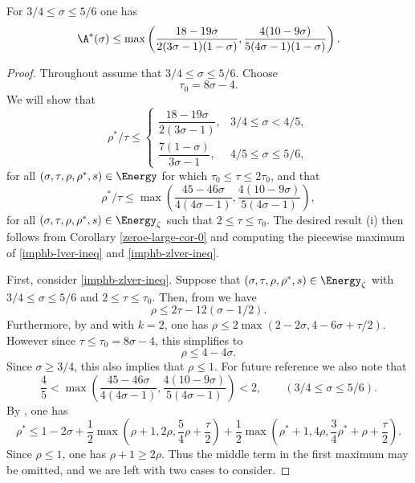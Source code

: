 \begin{theorem}\label{imp-hb-energy-bound}
For $3/4 \le \sigma \le 5/6$ one has
\[
\A^*(\sigma) \le \max\left(\frac{18 - 19\sigma}{2(3\sigma - 1)(1-\sigma)}, \frac{4(10 - 9\sigma)}{5(4\sigma - 1)(1 - \sigma)}\right).
\]
\end{theorem}

\derived
{}

\begin{proof} Throughout assume that $3/4 \le \sigma \le 5/6$. Choose
\[
\tau_0 = 8\sigma - 4.
\]
We will show that
\begin{equation}\label{imphb-lver-ineq}
\rho^*/\tau \le \begin{cases}
\dfrac{18 - 19\sigma}{2(3\sigma - 1)},&3/4 \le \sigma < 4/5,\\
\dfrac{7(1 - \sigma)}{3\sigma - 1},&4/5 \le \sigma \le 5/6,
\end{cases}
\end{equation}
for all $(\sigma, \tau, \rho, \rho^*, s) \in \Energy$ for which $\tau_0 \le \tau \le 2\tau_0$, and that
\begin{equation}\label{imphb-zlver-ineq}
\rho^*/\tau \le \max\left(\frac{45 - 46\sigma}{4(4\sigma - 1)}, \frac{4(10 - 9\sigma)}{5(4\sigma - 1)}\right),
\end{equation}
for all $(\sigma, \tau, \rho, \rho^*, s) \in \Energy_\zeta$ such that $2 \le \tau \le \tau_0$. The desired result (i) then follows from Corollary \ref{zeroe-large-cor-0} and computing the piecewise maximum of \eqref{imphb-lver-ineq} and \eqref{imphb-zlver-ineq}.

First, consider \eqref{imphb-zlver-ineq}. Suppose that $(\sigma, \tau, \rho, \rho^*, s)\in \Energy_\zeta$ with $3/4 \le \sigma \le 5/6$ and $2 \le \tau \le \tau_0$. Then, from  we have
\begin{equation}\label{hb-lv-rho-form}
\rho \le 2\tau - 12(\sigma - 1/2).
\end{equation}
Furthermore, by  and  with $k = 2$, one has $\rho \le 2\max(2 - 2\sigma, 4 - 6\sigma + \tau/2)$. However since $\tau \le \tau_0 = 8\sigma - 4$, this simplifies to
\begin{equation}
\label{huxley-lv-rho-form2}
\rho \le 4 - 4\sigma.
\end{equation}
Since $\sigma \ge 3/4$, this also implies that $\rho \le 1$. For future reference we also note that
\begin{equation}\label{zlver:tau-gradient-1}
\frac{4}{5} < \max\left(\frac{45 - 46\sigma}{4(4\sigma - 1)}, \frac{4(10 - 9\sigma)}{5(4\sigma - 1)}\right) < 2,\qquad (3/4 \le \sigma \le 5/6).
\end{equation}
By , one has
\[
\rho^* \leq 1-2\sigma + \frac{1}{2}\max\left(\rho+1, 2\rho, \frac{5}{4}\rho+\frac{\tau}{2}\right) + \frac{1}{2}\max\left(\rho^*+1, 4\rho, \frac{3}{4}\rho^*+\rho+\frac{\tau}{2}\right).
\]
Since $\rho \le 1$, one has $\rho + 1 \ge 2\rho$. Thus the middle term in the first maximum may be omitted, and we are left with two cases to consider.


\end{proof}
